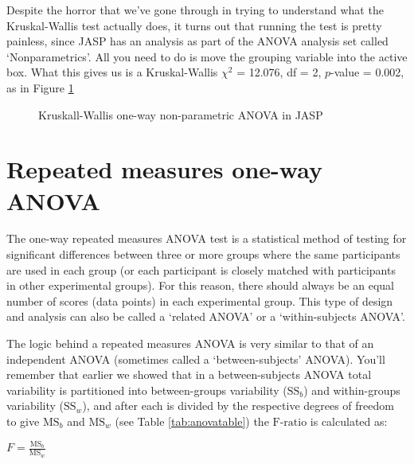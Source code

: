 
Despite the horror that we've gone through in trying to understand what the Kruskal-Wallis test actually does, it turns out that running the test is pretty painless, since JASP has an analysis as part of the ANOVA analysis set called `Nonparametrics'. All you need to do is move the grouping variable  into the active box. What this gives us is a Kruskal-Wallis $\chi^2$ = 12.076, df = 2, $p$-value = 0.002, as in Figure \ref{fig:anova6}

\vspace{0.5cm}
\begin{figure}[!ht]
\begin{center}
\caption{Kruskall-Wallis one-way non-parametric ANOVA in JASP}
\HR
\label{fig:anova6}
\end{center}
\end{figure}


\section{Repeated measures one-way ANOVA~\label{sec:RManova}}

The one-way repeated measures ANOVA test is a statistical method of testing for significant differences between three or more groups where the same participants are used in each group (or each participant is closely matched with participants in other experimental groups). For this reason, there should always be an equal number of scores (data points) in each experimental group. This type of design and analysis can also be called a `related ANOVA' or a `within-subjects ANOVA'. 

The logic behind a repeated measures ANOVA is very similar to that of an independent ANOVA (sometimes called a `between-subjects' ANOVA). You'll remember that earlier we showed that in a between-subjects ANOVA total variability is partitioned into between-groups variability ($\mbox{SS}_b$) and within-groups variability ($\mbox{SS}_w$), and after each is divided by the respective degrees of freedom to give $\mbox{MS}_b$ and $\mbox{MS}_w$ (see Table \ref{tab:anovatable}) the $\mbox{F-ratio}$ is calculated as:

\begin{center}
$F = \displaystyle\frac{ \mbox{MS}_b }{ \mbox{MS}_w }$ 
\end{center}

